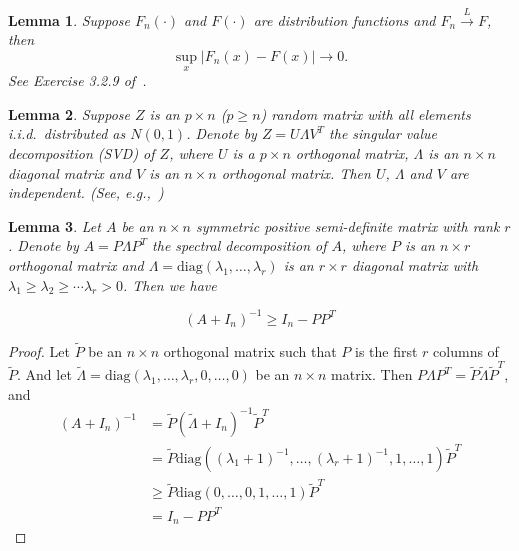 \documentclass[review]{elsarticle}
\theoremstyle{plain}
\newtheorem{lemma}{Lemma}
\theoremstyle{definition}
\theoremstyle{remark}
\begin{document}
\begin{lemma}\label{uniformLemma}
    Suppose $F_n(\cdot)$ and $F(\cdot)$ are distribution functions and $F_n\xrightarrow{L}F$, then
    \begin{equation*}
        \sup_x |F_n(x)-F(x)|\to 0.
    \end{equation*}
    See Exercise 3.2.9 of~\cite{durrett2010probability}.
\end{lemma}
\begin{lemma}\label{svdLemma}
    Suppose $Z$ is an $p\times n$ ($p\geq n$) random matrix with all elements i.i.d.\ distributed as $N(0,1)$. Denote by $Z=U\Lambda V^T$ the singular value decomposition (SVD) of $Z$, where $U$ is a $p\times n$ orthogonal matrix, $\Lambda$ is an $n\times n$ diagonal matrix and $V$ is an $n\times n$ orthogonal matrix. Then $U$, $\Lambda$ and $V$ are independent. (See, e.g.,~\cite{Eaton1983Multivariate})
\end{lemma}

\begin{lemma}\label{wangInverse}
    Let $A$ be an $n\times n$ symmetric positive semi-definite matrix with rank $r$. Denote by $A=P\Lambda P^T$ the spectral decomposition of $A$, where $P$ is an $n\times r$ orthogonal matrix and $\Lambda=\textrm{diag}(\lambda_1,\ldots,\lambda_r)$ is an $r\times r$ diagonal matrix with $\lambda_1\geq \lambda_2\geq\cdots \lambda_r >0$. Then we have

\begin{equation*}
    {(A+I_{n})}^{-1}\geq I_n- P P^T
\end{equation*}
\end{lemma}
\begin{proof}
    Let $\tilde{P}$ be an $n\times n$ orthogonal matrix such that $P$ is the first $r$ columns of $\tilde{P}$. And let $\tilde{\Lambda}=\textrm{diag}(\lambda_1,\ldots,\lambda_r,0,\ldots,0)$ be an $n\times n$ matrix. Then $P\Lambda P^T=\tilde{P}\tilde{\Lambda} \tilde{P}^T$, and
    \begin{equation*}
        \begin{aligned}
            {(A+I_{n})}^{-1}&=\tilde{P} {(\tilde{\Lambda} + I_n)}^{-1} \tilde{P}^T\\
            &=\tilde{P}\textrm{diag}({(\lambda_1+1)}^{-1},\ldots,{(\lambda_r+1)}^{-1},1,\ldots,1)  \tilde{P}^T\\
            &\geq\tilde{P}\textrm{diag}(0,\ldots,0,1,\ldots,1)  \tilde{P}^T\\
            &=I_n-PP^T
        \end{aligned}
    \end{equation*}
\end{proof}
\end{document}
